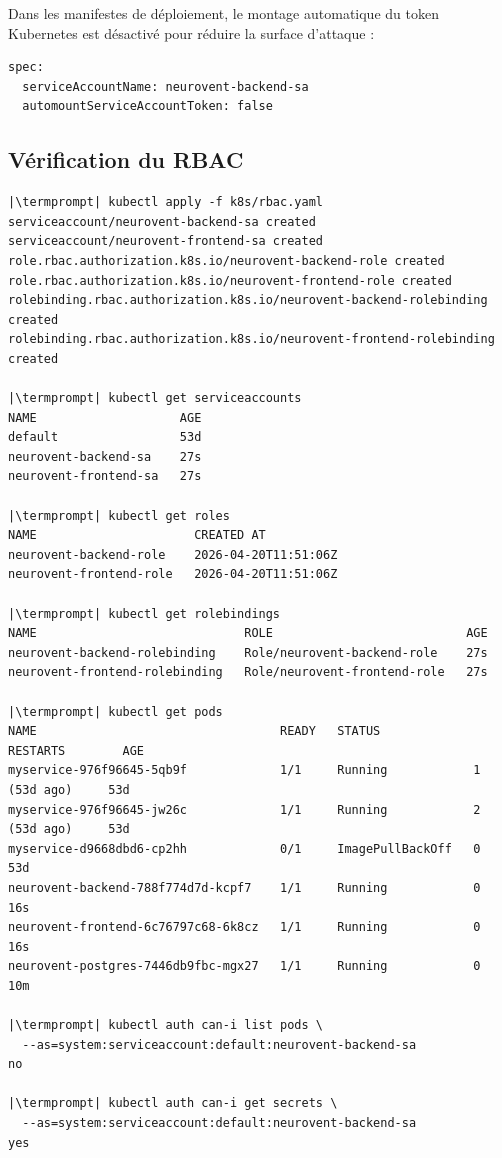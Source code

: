 \documentclass[12pt,a4paper]{article}
\makeatletter
\newcommand{\termprompt}{%
  \textcolor{termgreen}{\textbf{azouaou@Az-zou}}%
  \textcolor{termfg}{:}%
  \textcolor{termcyan}{\textasciitilde/NeuroVent}%
  \textcolor{termfg}{\$}}
\makeatother
\begin{document}
Dans les manifestes de déploiement, le montage automatique du token Kubernetes est
désactivé pour réduire la surface d'attaque :

\begin{lstlisting}[style=yaml, caption={Désactivation du token dans backend-deployment.yaml}]
spec:
  serviceAccountName: neurovent-backend-sa
  automountServiceAccountToken: false
\end{lstlisting}

\subsection{Vérification du RBAC}

\begin{lstlisting}[style=terminal, caption={Tests des permissions RBAC}]
|\termprompt| kubectl apply -f k8s/rbac.yaml
serviceaccount/neurovent-backend-sa created
serviceaccount/neurovent-frontend-sa created
role.rbac.authorization.k8s.io/neurovent-backend-role created
role.rbac.authorization.k8s.io/neurovent-frontend-role created
rolebinding.rbac.authorization.k8s.io/neurovent-backend-rolebinding created
rolebinding.rbac.authorization.k8s.io/neurovent-frontend-rolebinding created

|\termprompt| kubectl get serviceaccounts
NAME                    AGE
default                 53d
neurovent-backend-sa    27s
neurovent-frontend-sa   27s

|\termprompt| kubectl get roles
NAME                      CREATED AT
neurovent-backend-role    2026-04-20T11:51:06Z
neurovent-frontend-role   2026-04-20T11:51:06Z

|\termprompt| kubectl get rolebindings
NAME                             ROLE                           AGE
neurovent-backend-rolebinding    Role/neurovent-backend-role    27s
neurovent-frontend-rolebinding   Role/neurovent-frontend-role   27s

|\termprompt| kubectl get pods
NAME                                  READY   STATUS             RESTARTS        AGE
myservice-976f96645-5qb9f             1/1     Running            1 (53d ago)     53d
myservice-976f96645-jw26c             1/1     Running            2 (53d ago)     53d
myservice-d9668dbd6-cp2hh             0/1     ImagePullBackOff   0               53d
neurovent-backend-788f774d7d-kcpf7    1/1     Running            0               16s
neurovent-frontend-6c76797c68-6k8cz   1/1     Running            0               16s
neurovent-postgres-7446db9fbc-mgx27   1/1     Running            0               10m

|\termprompt| kubectl auth can-i list pods \
  --as=system:serviceaccount:default:neurovent-backend-sa
no

|\termprompt| kubectl auth can-i get secrets \
  --as=system:serviceaccount:default:neurovent-backend-sa
yes
\end{lstlisting}
\end{document}
